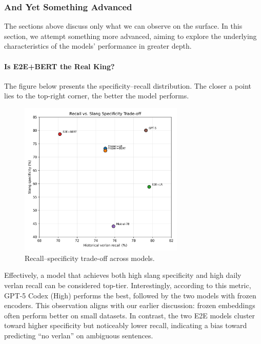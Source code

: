 \documentclass[12pt]{article}
\begin{document}
\subsubsection{And Yet Something Advanced}

The sections above discuss only what we can observe on the surface. 
In this section, we attempt something more advanced, aiming to explore the underlying characteristics of the models' performance in greater depth.

\paragraph{Is E2E+BERT the Real King?}

The figure below presents the specificity--recall distribution. 
The closer a point lies to the top-right corner, the better the model performs.

\begin{figure}[H]
    \centering
    \includegraphics[width=0.7\textwidth]{figures/historical_vs_slang_tradeoff.png}
    \caption{Recall--specificity trade-off across models.}
    \label{fig:tradeoff-scatter}
\end{figure}

Effectively, a model that achieves both high slang specificity and high daily verlan recall can be considered top-tier. 
Interestingly, according to this metric, GPT-5 Codex (High) performs the best, followed by the two models with frozen encoders. 
This observation aligns with our earlier discussion: frozen embeddings often perform better on small datasets. 
In contrast, the two E2E models cluster toward higher specificity but noticeably lower recall, indicating a bias toward predicting ``no verlan'' on ambiguous sentences.
\end{document}
